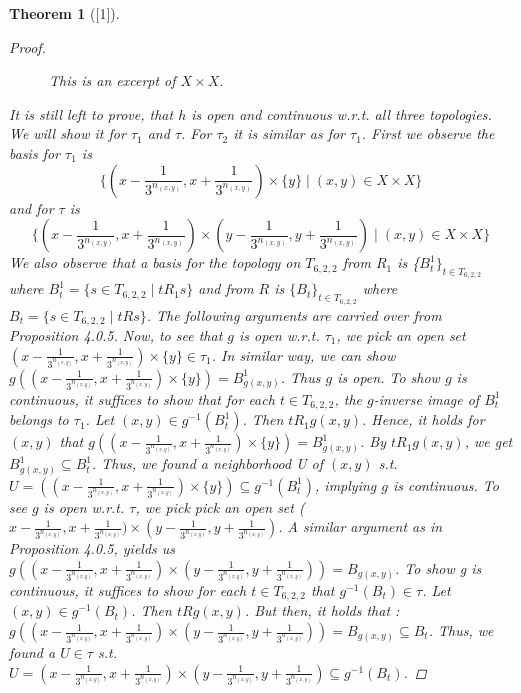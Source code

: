 \documentclass[12pt, a4paper]{scrartcl}
\newtheorem{theorem}[definition]{Theorem}
\begin{document}
\begin{theorem}[\textnormal{[1]}]
\begin{proof}
\begin{figure}[h]
\begin{center}
\begin{tikzpicture}[scale=0.73]
    \end{tikzpicture}
    \caption{This is an excerpt of $X \times X$.}
\end{center}
\end{figure}    
    It is still left to prove, that $h$ is open and continuous w.r.t. all three topologies. We will show it for $\tau_1$ and $\tau$. For $\tau_2$ it is similar as for $\tau_1$.\newline \newline
    First we observe the basis for $\tau_1$ is 
    $$\{(x - \frac{1}{3^{n_{(x,y)}}}, x +\frac{1}{3^{n_{(x,y)}}}) \times \{y\} \mid (x,y) \in X \times X\}$$
    and for $\tau$ is 
    $$\{(x - \frac{1}{3^{n_{(x,y)}}}, x +\frac{1}{3^{n_{(x,y)}}}) \times (y - \frac{1}{3^{n_{(x,y)}}}, y +\frac{1}{3^{n_{(x,y)}}}) \mid (x,y) \in X \times X\}$$
    We also observe that a basis for the topology on $T_{6,2,2}$ from $R_1$ is \{$B^1_t\}_{t \in T_{6,2,2}}$ where $B^1_t = \{s \in T_{6,2,2} \mid t R_1 s\}$ 
    and from $R$ is $\{B_t\}_{t \in T_{6,2,2}}$ where $B_t = \{s \in T_{6,2,2} \mid t R s\}$. The following arguments are carried over from Proposition 4.0.5. \newline
    Now, to see that $g$ is open w.r.t. $\tau_1$, we pick an open set $(x - \frac{1}{3^{n_{(x,y)}}}, x + \frac{1}{3^{n_{(x,y)}}}) \times \{y\} \in \tau_1$. 
    In similar way, we can show $g((x - \frac{1}{3^{n_{(x,y)}}}, x + \frac{1}{3^{n_{(x,y)}}}) \times \{y\}) = B^1_{g(x,y)}$. Thus $g$ is open.
    To show $g$ is continuous, it suffices to show that for each $t \in T_{6,2,2}$, the $g$-inverse image of $B^1_t$ belongs to $\tau_1$. Let $(x,y) \in g^{-1}(B^1_t)$. 
    Then $tR_1g(x,y)$. Hence, it holds for $(x,y)$ that $g((x - \frac{1}{3^{n_{(x,y)}}}, x + \frac{1}{3^{n_{(x,y)}}}) \times \{y\}) = B^1_{g(x,y)}$. By $t R_1g(x,y)$, we get
    $B^1_{g(x,y)} \subseteq B^1_t$. Thus, we found a neighborhood U of $(x,y)$ s.t. $U = ((x - \frac{1}{3^{n_{(x,y)}}}, x + \frac{1}{3^{n_{(x,y)}}}) \times \{y\}) \subseteq g^{-1}(B^1_t)$, implying $g$ is continuous.  \newline
    To see $g$ is open w.r.t. $\tau$, we pick pick an open set ($x- \frac{1}{3^{n_{(x,y)}}}, x+ \frac{1}{3^{n_{(x,y)}}}) \times (y- \frac{1}{3^{n_{(x,y)}}}, y+ \frac{1}{3^{n_{(x,y)}}})$. A similar argument as in Proposition 4.0.5, yields 
    us $g((x- \frac{1}{3^{n_{(x,y)}}}, x+ \frac{1}{3^{n_{(x,y)}}}) \times (y- \frac{1}{3^{n_{(x,y)}}}, y+ \frac{1}{3^{n_{(x,y)}}})) = B_{g(x,y)}$. \newline
    To show g is continuous, it suffices to show for each $t \in T_{6,2,2}$ that $g^{-1}(B_t) \in \tau$. Let $(x,y) \in g^{-1}(B_t)$. Then $tRg(x,y)$. But then, it holds that :
    $g((x- \frac{1}{3^{n_{(x,y)}}}, x+ \frac{1}{3^{n_{(x,y)}}}) \times (y- \frac{1}{3^{n_{(x,y)}}}, y+ \frac{1}{3^{n_{(x,y)}}})) = B_{g(x,y)} \subseteq B_t$. Thus, we found a $U \in \tau$ 
    s.t. $U = (x- \frac{1}{3^{n_{(x,y)}}}, x+ \frac{1}{3^{n_{(x,y)}}}) \times (y- \frac{1}{3^{n_{(x,y)}}}, y+ \frac{1}{3^{n_{(x,y)}}}) \subseteq g^{-1}(B_t)$.


\end{proof}
\end{theorem}
\end{document}
